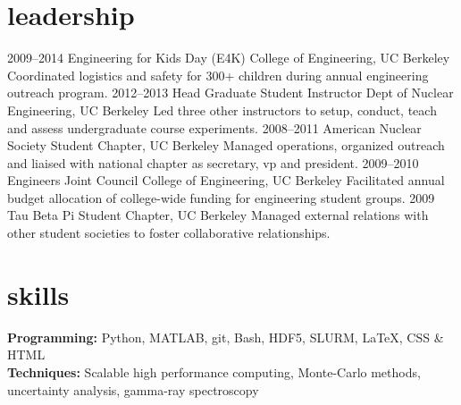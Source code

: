 \documentclass[print]{resume} %
\begin{document}
\section{leadership}
\begin{entrylist}
\entry
{2009--2014}
{Engineering for Kids Day (E4K)}
{College of Engineering, UC Berkeley}
{
Coordinated logistics and safety for 300+ children during annual engineering outreach program.
}
\entry
{2012--2013}
{Head Graduate Student Instructor}
{Dept of Nuclear Engineering, UC Berkeley}
{
Led three other instructors to setup, conduct, teach and assess undergraduate course experiments.
}
\entry
{2008--2011}
{American Nuclear Society}
{Student Chapter, UC Berkeley}
{
Managed operations, organized outreach and liaised with national chapter as secretary, vp and president.%
}
\entry
{2009--2010}
{Engineers Joint Council}
{College of Engineering, UC Berkeley}
{
Facilitated annual budget allocation of college-wide funding for engineering student groups.
}
\entry
{2009}
{Tau Beta Pi}
{Student Chapter, UC Berkeley}
{
Managed external relations with other student societies to foster collaborative relationships.
}
\end{entrylist}

\section{skills}
\textbf{Programming:} Python, MATLAB, git, Bash, HDF5, SLURM, \LaTeX, CSS \& HTML\\
\textbf{Techniques:} Scalable high performance computing, Monte-Carlo methods, uncertainty analysis, gamma-ray spectroscopy

%

\end{document}
